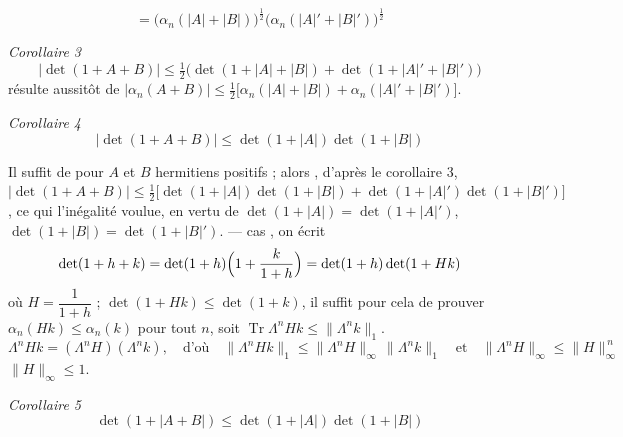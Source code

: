 \documentclass[11pt,a4paper]{article}
\begin{document}
\[
  = \bigl(\alpha_n(|A| + |B|)\bigr)^{\frac12} \bigl(\alpha_n(|A|' + |B|')\bigr)^{\frac12}
\]

\emph{Corollaire 3} 
\[
  |\det(1 + A + B)| \leq \tfrac12\bigl(\det(1 + |A| + |B|) + \det(1 + |A|' + |B|')\bigr)
\]
 résulte aussitôt de $|\alpha_n(A+B)| \leq \frac12\bigl[\alpha_n(|A| + |B|) + \alpha_n(|A|' + |B|')\bigr]$.

\emph{Corollaire 4} 
\[
  |\det(1 + A + B)| \leq \det(1 + |A|)\det(1 + |B|)
\]

Il suffit de \struck{\ill{}}   pour $A$ et $B$ hermitiens positifs ;  alors  , d'après le corollaire 3, $|\det(1 + A + B)| \leq \frac12\bigl[\det(1 + |A|)\det(1 + |B|) + \det(1 + |A|')\det(1 + |B|')\bigr]$, ce qui  l'inégalité voulue, en vertu de $\det(1 + |A|) = \det(1 + |A|')$, $\det(1 + |B|) = \det(1 + |B|')$. ---   cas   , on écrit
\[
  \det(1 + h + k) = \det(1 + h)\Bigl(1 + \frac{k}{1 + h}\Bigr) = \det(1 + h)\det(1 + Hk)
\]
 où $H = \dfrac{1}{1+h}$ ; \ill{}  \ill{}   $\det(1 + Hk) \leq \det(1 + k)$, il suffit pour cela de prouver $\alpha_n(Hk) \leq \alpha_n(k)$ pour tout $n$, soit $\operatorname{Tr}\Lambda^n Hk \leq \|\Lambda^n k\|_1$.   
\[
  \Lambda^n Hk = (\Lambda^n H)(\Lambda^n k), \quad \text{d'où} \quad \|\Lambda^n Hk\|_1 \leq \|\Lambda^n H\|_\infty\, \|\Lambda^n k\|_1 \quad \text{et} \quad \|\Lambda^n H\|_\infty \leq \|H\|_\infty^{\,n}
\]
\ill{} $\|H\|_\infty \leq 1$.

\emph{Corollaire 5} 
\[
  \det(1 + |A + B|) \leq \det(1 + |A|)\det(1 + |B|)
\]

\end{document}
